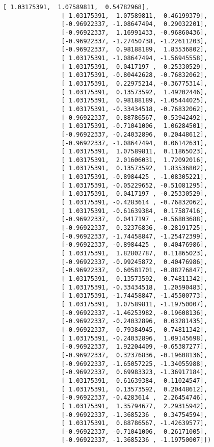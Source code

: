 \documentclass[11pt]{article}
\begin{document}
\begin{Verbatim}[commandchars=\\\{\}]
                [ 1.03175391,  1.07589811,  0.54782968],
                [ 1.03175391,  1.07589811,  0.46199379],
                [-0.96922337, -1.08647494,  0.29032201],
                [-0.96922337,  1.16991433, -0.96860436],
                [-0.96922337, -1.27450738, -1.22611203],
                [-0.96922337,  0.98188189,  1.83536802],
                [ 1.03175391, -1.08647494, -1.56945558],
                [ 1.03175391,  0.0417197 , -0.25330529],
                [ 1.03175391, -0.80442628, -0.76832062],
                [ 1.03175391,  0.22975214, -0.36775314],
                [ 1.03175391,  0.13573592,  1.49202446],
                [ 1.03175391,  0.98188189, -1.05444025],
                [ 1.03175391, -0.33434518, -0.76832062],
                [-0.96922337,  0.88786567, -0.53942492],
                [ 1.03175391, -0.71041006,  1.06284501],
                [-0.96922337, -0.24032896,  0.20448612],
                [-0.96922337, -1.08647494,  0.06142631],
                [ 1.03175391,  1.07589811,  0.11865023],
                [ 1.03175391,  2.01606031,  1.72092016],
                [ 1.03175391,  0.13573592,  1.83536802],
                [ 1.03175391, -0.8984425 , -1.08305221],
                [ 1.03175391, -0.05229652, -0.51081295],
                [ 1.03175391,  0.0417197 , -0.25330529],
                [ 1.03175391, -0.4283614 , -0.76832062],
                [ 1.03175391, -0.61639384,  0.17587416],
                [-0.96922337,  0.0417197 , -0.56803688],
                [-0.96922337,  0.32376836, -0.28191725],
                [-0.96922337, -1.74458847, -1.25472399],
                [-0.96922337, -0.8984425 ,  0.40476986],
                [ 1.03175391,  1.82802787,  0.11865023],
                [-0.96922337, -0.99245872,  0.40476986],
                [-0.96922337,  0.60581701, -0.88276847],
                [ 1.03175391,  0.13573592,  0.74811342],
                [ 1.03175391, -0.33434518,  1.20590483],
                [ 1.03175391, -1.74458847, -1.45500773],
                [ 1.03175391,  1.07589811, -1.19750007],
                [-0.96922337, -1.46253982, -0.19608136],
                [-0.96922337, -0.24032896,  0.03281435],
                [-0.96922337,  0.79384945,  0.74811342],
                [ 1.03175391, -0.24032896,  1.09145698],
                [-0.96922337,  1.92204409, -0.65387277],
                [-0.96922337,  0.32376836, -0.19608136],
                [-0.96922337, -1.65057225, -1.34055988],
                [-0.96922337,  0.69983323, -1.36917184],
                [ 1.03175391, -0.61639384, -0.11024547],
                [ 1.03175391,  0.13573592,  0.20448612],
                [-0.96922337, -0.4283614 ,  2.26454746],
                [ 1.03175391,  1.35794677,  2.29315942],
                [-0.96922337, -1.3685236 ,  0.34754594],
                [ 1.03175391,  0.88786567, -1.42639577],
                [-0.96922337, -0.71041006,  0.26171005],
                [-0.96922337, -1.3685236 , -1.19750007]])
\end{Verbatim}
            
\end{document}
